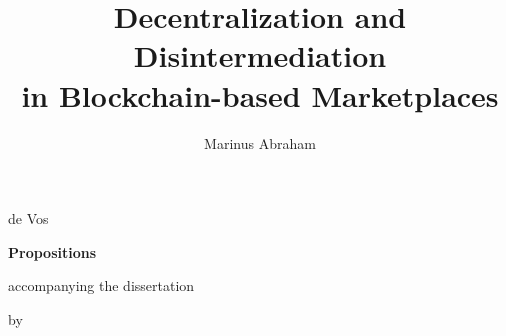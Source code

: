 \documentclass{propositions}
\begin{document}
\title{Decentralization and Disintermediation\\ in Blockchain-based Marketplaces}
\author{Marinus Abraham}{de Vos}

\begin{center}

{\Large\titlefont\bfseries Propositions}

\medskip

accompanying the dissertation

\medskip

{\makeatletter
\titlestyle\bfseries\large\@title
\makeatother}

{\makeatletter
\ifx\@subtitle\undefined\else
    \titlefont\titleshape\@subtitle
\fi
\makeatother}

\medskip

by

\medskip

\makeatletter
{\large\titlefont\bfseries\@firstname\ {\titleshape\@lastname}}
\makeatother

\end{center}

\bigskip
\end{document}
